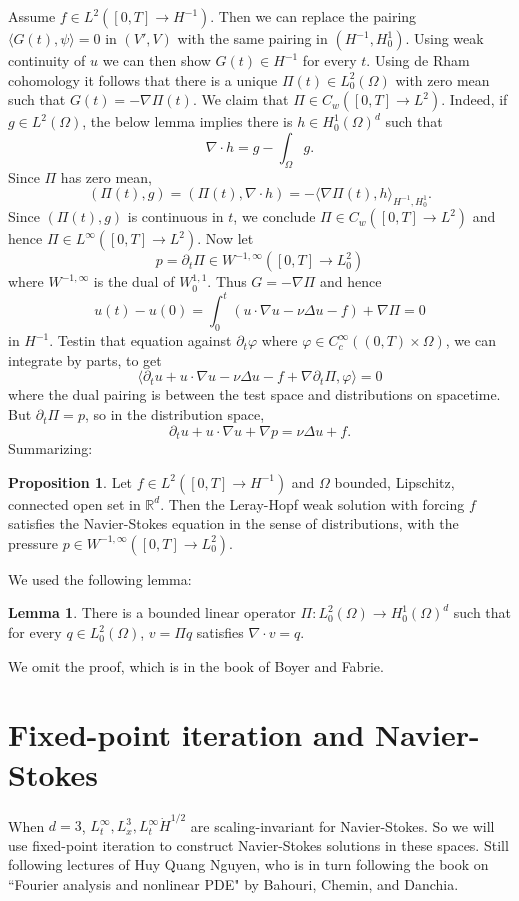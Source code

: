 \documentclass[12pt]{book}
\newcommand{\RR}{\mathbb{R}}
\theoremstyle{definition}
\newtheorem{lemma}[theorem]{Lemma}
\newtheorem{proposition}[theorem]{Proposition}
\begin{document}
Assume $f \in L^2([0, T] \to H^{-1})$. Then we can replace the pairing $\langle G(t), \psi\rangle = 0$ in $(V', V)$ with the same pairing in $(H^{-1}, H^1_0)$.
Using weak continuity of $u$ we can then show $G(t) \in H^{-1}$ for every $t$.
Using de Rham cohomology it follows that there is a unique $\Pi(t) \in L^2_0(\Omega)$ with zero mean such that $G(t) = -\nabla \Pi(t)$.
We claim that $\Pi \in C_w([0, T] \to L^2)$.
Indeed, if $g \in L^2(\Omega)$, the below lemma implies there is $h \in H^1_0(\Omega)^d$ such that
$$\nabla \cdot h = g - \int_\Omega g.$$
Since $\Pi$ has zero mean,
$$(\Pi(t), g) = (\Pi(t), \nabla \cdot h) = -\langle \nabla \Pi(t), h\rangle_{H^{-1},H^1_0}.$$
Since $(\Pi(t), g)$ is continuous in $t$, we conclude $\Pi \in C_w([0, T] \to L^2)$ and hence $\Pi \in L^\infty([0, T] \to L^2)$.
Now let
$$p = \partial_t \Pi \in W^{-1,\infty}([0, T] \to L^2_0)$$
where $W^{-1, \infty}$ is the dual of $W^{1,1}_0$. Thus $G = -\nabla \Pi$ and hence
$$u(t) - u(0) = \int_0^t (u \cdot \nabla u - \nu \Delta u - f) + \nabla \Pi = 0$$
in $H^{-1}$.
Testin that equation against $\partial_t\varphi$ where $\varphi \in C^\infty_c((0, T) \times \Omega)$, we can integrate by parts, to get
$$\langle \partial_t u + u \cdot \nabla u - \nu \Delta u - f + \nabla \partial_t \Pi, \varphi\rangle = 0$$
where the dual pairing is between the test space and distributions on spacetime.
But $\partial_t \Pi = p$, so in the distribution space,
$$\partial_t u + u \cdot \nabla u + \nabla p = \nu \Delta u + f.$$
Summarizing:

\begin{proposition}
Let $f \in L^2([0, T] \to H^{-1})$ and $\Omega$ bounded, Lipschitz, connected open set in $\RR^d$.
Then the Leray-Hopf weak solution with forcing $f$ satisfies the Navier-Stokes equation in the sense of distributions, with the pressure $p \in W^{-1,\infty}([0, T] \to L^2_0)$.
\end{proposition}

We used the following lemma:

\begin{lemma}
There is a bounded linear operator $\Pi: L^2_0(\Omega) \to H^1_0(\Omega)^d$ such that for every $q \in L^2_0(\Omega)$, $v = \Pi q$ satisfies $\nabla \cdot v = q$.
\end{lemma}

We omit the proof, which is in the book of Boyer and Fabrie.

\chapter{Fixed-point iteration and Navier-Stokes}
When $d = 3$, $L^\infty_t,L^3_x,L^\infty_t\dot H^{1/2}$ are scaling-invariant for Navier-Stokes.
So we will use fixed-point iteration to construct Navier-Stokes solutions in these spaces.
Still following lectures of Huy Quang Nguyen, who is in turn following the book on ``Fourier analysis and nonlinear PDE" by Bahouri, Chemin, and Danchia.
\end{document}
